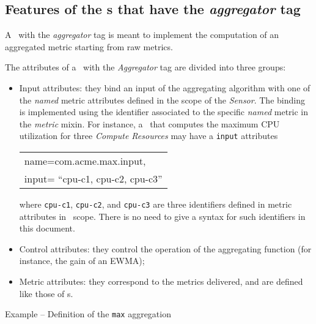 \documentclass[10pt]{article}  %
\begin{document}

\subsection{Features of the \mi s that have the {\em aggregator} tag \label{sec:Aggregator}}

A \mi\ with the {\em aggregator} tag is meant to implement the computation of an aggregated metric starting from raw metrics. 


The attributes of a \mi\ with the {\em Aggregator} tag are divided into three groups:

\begin{itemize}

\item Input attributes: they bind an input of the aggregating algorithm with one of the {\em named} metric attributes defined in the scope of the {\em Sensor}. The binding is implemented using the identifier associated to the specific {\em named} metric in the {\em metric} mixin. For instance, a \sens\ that computes the maximum CPU utilization for three {\em Compute Resources} may have a {\tt input} attributes 

\begin{tabular}{l}
name=com.acme.max.input, \\
input= ``cpu-c1, cpu-c2, cpu-c3'' 
\end{tabular}

where {\small \tt cpu-c1}, {\small \tt cpu-c2}, and {\small \tt cpu-c3} are three identifiers defined in metric attributes in \sens\ scope. There is no need to give a syntax for such identifiers in this document.

\item Control attributes: they control the operation of the aggregating function (for instance, the gain of an EWMA);

\item Metric attributes: they correspond to the metrics delivered, and are defined like those of \coll s.
\end{itemize}

\begin{table}
\caption{Example -- Definition of the {\tt \small max} aggregation \mi } 
\end{table}
\end{document}
